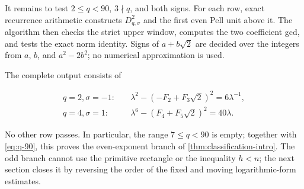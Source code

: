It remains to test $2\leqslant q<90$, $3\nmid q$, and both signs. For each
row, exact recurrence arithmetic constructs $D_{q,\sigma}^2$ and the first
even Pell unit above it. The algorithm then checks the strict upper window,
computes the two coefficient gcd, and tests the exact norm identity. Signs of
$a+b\sqrt2$ are decided over the integers from $a$, $b$, and
$a^2-2b^2$; no numerical approximation is used.

The complete output consists of

\begin{align}
 q=2, \sigma=-1:
 &\quad
 \lambda^2-(-F_2+F_3\sqrt2)^2
 =6\lambda^{-1},
 \label{eq:low-q2}\\
 q=4, \sigma=1:
 &\quad
 \lambda^6-(F_4+F_5\sqrt2)^2
 =40\lambda.
 \label{eq:low-q4}
\end{align}

No other row passes. In particular, the range $7\leqslant q<90$ is empty;
together with \cref{eq:q-90}, this proves the even-exponent branch of
\cref{thm:classification-intro}. The odd branch cannot use the primitive
rectangle or the inequality $h<n$; the next section closes it by reversing
the order of the fixed and moving logarithmic-form estimates.
